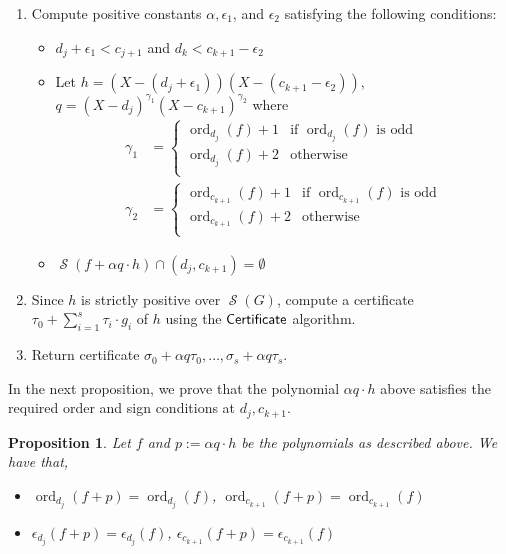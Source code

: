 \documentclass[preprint,12pt,authoryear]{elsarticle}
\newtheorem{proposition}[theorem]{Proposition}
\DeclareMathOperator{\semialgebraic}{\mathcal{S}}
\DeclareMathOperator{\ord}{ord}
\DeclareMathOperator{\algPutinar}{\sf Certificate}
\begin{document}
\begin{enumerate}
\item Compute positive constants $\alpha, \epsilon_1$, and $\epsilon_2$
  satisfying the following conditions:
  \begin{itemize}
  \item $d_j + \epsilon_1 < c_{j+1}$ and $d_k < c_{k+1} - \epsilon_2$
  \item Let
    $h = (X - (d_j + \epsilon_1))(X - (c_{k+1} - \epsilon_2))$,
    $q = (X - d_j)^{\gamma_1}(X - c_{k+1})^{\gamma_2}$ where
    \begin{equation} 
      \label{item:let-h-=}
      \begin{split}
        \gamma_1 &= \begin{cases}
          \ord_{d_j}(f) + 1  & \text{if } \ord_{d_j}(f) \text{ is odd}\\
          \ord_{d_j}(f) + 2 & \text{otherwise} \\
        \end{cases}\\
        \gamma_2 &= \begin{cases}
          \ord_{c_{k+1}}(f) + 1  & \text{if } \ord_{c_{k+1}}(f) \text{ is odd}\\
          \ord_{c_{k+1}}(f) + 2 & \text{otherwise} \\
        \end{cases}
      \end{split}
    \end{equation}
  \item
    $\semialgebraic(f + \alpha q \cdot h) \cap (d_j, c_{k+1}) = \emptyset$
  \end{itemize} 
\item Since $h$ is strictly positive over $\semialgebraic(G)$, compute a
 certificate $\tau_0 + \sum_{i=1}^{s}{\tau_i \cdot g_i}$ of $h$ using the
  $\algPutinar$ algorithm.
\item Return certificate
  $\sigma_0 + \alpha q \tau_0, \dots, \sigma_s + \alpha q \tau_s$.
\end{enumerate}

In the next proposition, we prove that the polynomial $\alpha q \cdot h$ above
satisfies the required order and sign conditions at $d_j, c_{k+1}$.

\begin{proposition}
  \th\label{sec:remov-redund-strictl-2} Let $f$ and $p := \alpha q \cdot h$ be
  the polynomials as described above. We have that,
  \begin{itemize}
  \item $\ord_{d_j}(f + p) = \ord_{d_j}(f)$,
    $\ord_{c_{k+1}}(f + p) = \ord_{c_{k+1}}(f)$
  \item $\epsilon_{d_j}(f + p) = \epsilon_{d_j}(f)$, $\epsilon_{c_{k+1}}(f + p)
    = \epsilon_{c_{k+1}}(f)$
  \end{itemize}
\end{proposition}
\end{document}
